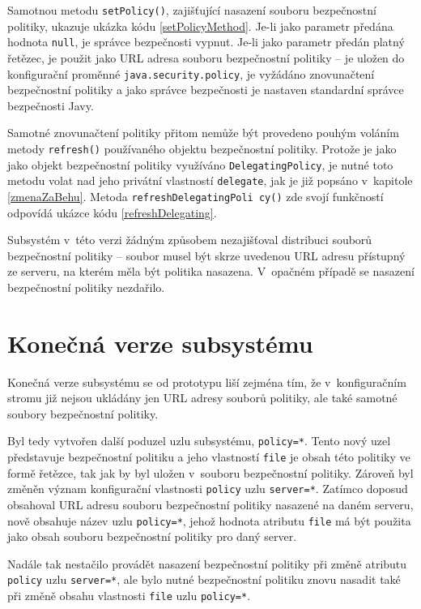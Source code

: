 Samotnou metodu {\tt setPolicy()}, zajišťující nasazení souboru bezpečnostní politiky, ukazuje ukázka kódu \ref{setPolicyMethod}.
Je-li jako parametr předána hodnota  {\tt null}, je správce bezpečnosti vypnut.
Je-li jako parametr předán platný řetězec, je použit jako URL adresa souboru bezpečnostní politiky -- je uložen do konfigurační proměnné {\tt java.security.policy}, je vyžádáno znovunačtení bezpečnostní politiky a jako správce bezpečnosti je nastaven standardní správce bezpečnosti Javy.

Samotné znovunačtení politiky přitom nemůže být provedeno pouhým voláním metody {\tt refresh()} používaného objektu bezpečnostní politiky.
Protože je jako jako objekt bezpečnostní politiky využíváno {\tt DelegatingPolicy}, je nutné toto metodu volat nad jeho privátní vlastností {\tt delegate},
jak je již popsáno v~kapitole \ref{zmenaZaBehu}. Metoda {\tt refreshDelegatingPoli cy()} zde svojí funkčností odpovídá ukázce kódu \ref{refreshDelegating}.

Subsystém v~této verzi žádným způsobem nezajišťoval distribuci souborů bezpečnostní politiky -- soubor musel být skrze uvedenou URL adresu přístupný ze serveru, na kterém měla být politika nasazena. V~opačném případě se nasazení bezpečnostní politiky nezdařilo.

\section{Konečná verze subsystému}

Konečná verze subsystému se od prototypu liší zejména tím, že v~konfiguračním stromu již nejsou ukládány jen URL adresy souborů politiky, ale také samotné soubory bezpečnostní politiky.

Byl tedy vytvořen další poduzel uzlu subsystému, {\tt policy=*}. Tento nový uzel představuje bezpečnostní politiku a jeho vlastností {\tt file} je obsah této politiky ve formě řetězce, tak jak by byl uložen v~souboru bezpečnostní politiky.
Zároveň byl změněn význam konfigurační vlastnosti {\tt policy} uzlu {\tt server=*}. Zatímco doposud obsahoval URL adresu souboru bezpečnostní politiky nasazené na daném serveru, nově obsahuje název uzlu {\tt policy=*}, jehož hodnota atributu {\tt file} má být použita jako obsah souboru bezpečnostní politiky pro daný server.

Nadále tak nestačilo provádět nasazení bezpečnostní politiky při změně atributu {\tt policy} uzlu {\tt server=*}, ale bylo nutné bezpečnostní politiku znovu nasadit také při změně obsahu vlastnosti {\tt file} uzlu {\tt policy=*}.

